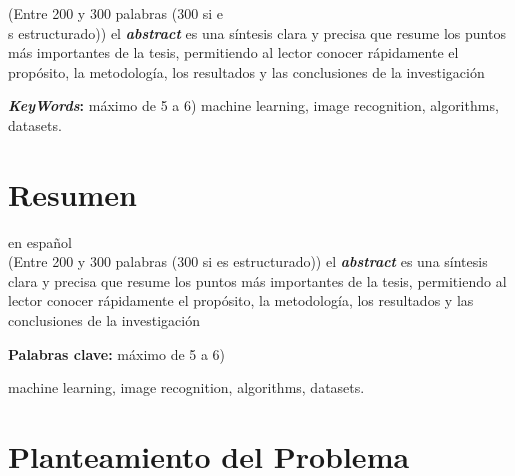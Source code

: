\documentclass[a4paper,12pt]{article}
\begin{document}
	(Entre 200 y 300 palabras (300 si e\\
	s estructurado))
	el \textbf{\textit{abstract}} es una síntesis clara y precisa que resume los puntos más importantes de la tesis, permitiendo al lector conocer rápidamente el propósito, la metodología, los resultados y las conclusiones de la investigación
	
\textbf{\textit{KeyWords}:} máximo de 5 a 6)
 machine learning, image recognition, algorithms, datasets.
\section*{Resumen} en español	\\
	(Entre 200 y 300 palabras (300 si es estructurado))
	el \textbf{\textit{abstract}} es una síntesis clara y precisa que resume los puntos más importantes de la tesis, permitiendo al lector conocer rápidamente el propósito, la metodología, los resultados y las conclusiones de la investigación

\textbf{Palabras clave:} máximo de 5 a 6)
machine learning, image recognition, algorithms, datasets.

	\section{Planteamiento del Problema}
	
\end{document}
